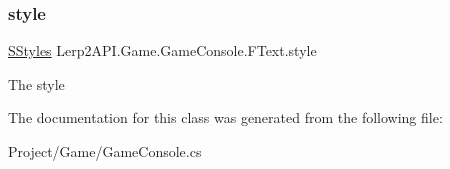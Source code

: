 \subsubsection{\texorpdfstring{style}{style}}
{\footnotesize\ttfamily \hyperlink{namespace_lerp2_a_p_i_1_1_game_a40a896b145d802bb883b777ab7413d7b}{S\+Styles} Lerp2\+A\+P\+I.\+Game.\+Game\+Console.\+F\+Text.\+style}



The style 



The documentation for this class was generated from the following file\+:\begin{DoxyCompactItemize}
\item 
Project/\+Game/Game\+Console.\+cs\end{DoxyCompactItemize}
